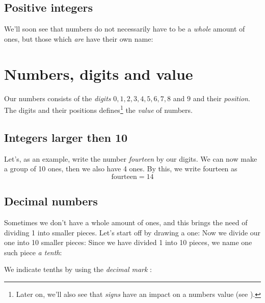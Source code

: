 \subsection*{Positive integers}
We'll soon see that numbers do not necessarily have to be a \textsl{whole} amount of ones, but those which \textsl{are} have their own name:\regv


\newpage
\section{Numbers, digits and value}
Our numbers consists of the \textit{digits} $ 0, 1, 2 , 3, 4, 5, 6, 7, 8 $ and $ 9 $ and their \textsl{position}. The digits and their positions defines\footnote{Later on, we'll also see that \textit{signs} have an impact on a numbers value  (see ).} the \textit{value}  of numbers.
\subsection*{Integers larger then 10}
Let's, as an example, write the number \textsl{fourteen} by our digits.
We can now make a group of 10 ones, then we also have 4 ones. By this, we write fourteen as
\[ \text{fourteen}=14 \]
\vsk

\newpage
\subsection*{Decimal numbers}
Sometimes we don't have a whole amount of ones, and this brings the need of dividing 1 into smaller pieces. Let's start off by drawing a one:
Now we divide our one into 10 smaller pieces:
Since we have divided 1 into 10 pieces, we name one such piece \textit{a tenth}:
\begin{comment}
\eks{\vs
	\fig{maal2}
	\fig{des2}
}\vsk
\end{comment}
We indicate tenths by using the \textit{decimal mark}   :
\regv
{}
\newpage
